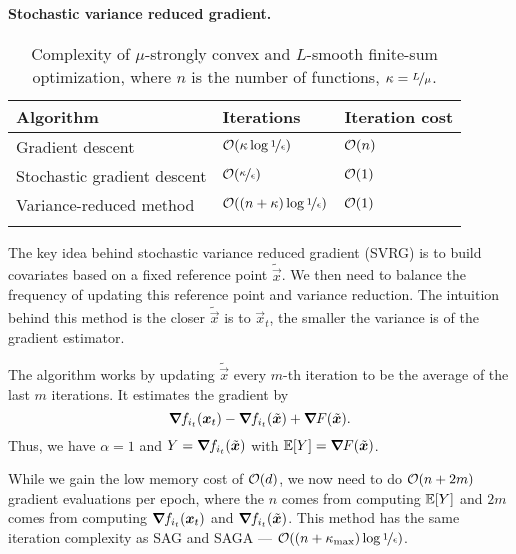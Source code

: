 \paragraph{Stochastic variance reduced gradient.}

\begin{table}[t]
    \centering
    \caption{Complexity of $\mu$-strongly convex and $L$-smooth finite-sum optimization, where $n$ is the number of functions, $\kappa = \nicefrac{L}{\mu}$.}
    \label{tab:vr}
    \begin{tabular}{lll} \toprule
        \textbf{Algorithm}          & \textbf{Iterations}                               & \textbf{Iteration cost} \\
        \midrule
        Gradient descent            & $\bigo{\kappa \log \nicefrac{1}{\epsilon}}$       & $\bigo{n}$              \\
        Stochastic gradient descent & $\bigo{\nicefrac{\kappa}{\epsilon}}$              & $\bigo{1}$              \\
        Variance-reduced method     & $\bigo{(n + \kappa) \log \nicefrac{1}{\epsilon}}$ & $\bigo{1}$              \\
        \bottomrule                                                                                               \\
    \end{tabular}
\end{table}

The key idea behind stochastic variance reduced gradient (SVRG) is to build covariates based on a
fixed reference point $\tilde{\vec{x}}$. We then need to balance the frequency of updating this
reference point and variance reduction. The intuition behind this method is the closer $\tilde{\vec{x}}$ is to $\vec{x}_t$,
the smaller the variance is of the gradient estimator.

The algorithm works by updating $\tilde{\vec{x}}$ every $m$-th iteration to be the average of the
last $m$ iterations. It estimates the gradient by \[
    \bm{\nabla}_{\! } f_{i_t}(\bm{x}_t) - \bm{\nabla}_{\! } f_{i_t}(\tilde{\bm{x}}) + \bm{\nabla}_{\! } F(\tilde{\bm{x}}).
\]
Thus, we have $\alpha=1$ and $Y=\bm{\nabla}_{\! } f_{i_t}(\tilde{\bm{x}})$ with $\mathbb{E}[Y] =
    \bm{\nabla}_{\! } F(\tilde{\bm{x}})$.

While we gain the low memory cost of $\bigo{d}$, we now need to do $\bigo{n+2m}$ gradient
evaluations per epoch, where the $n$ comes from computing $\mathbb{E}[Y]$ and $2m$ comes from computing
$\bm{\nabla}_{\! } f_{i_t}(\bm{x}_t)$ and $\bm{\nabla}_{\! } f_{i_t}(\tilde{\bm{x}})$. This method has the same
iteration complexity as SAG and SAGA --- $\bigo{(n + \kappa_{\max})\log \nicefrac{1}{\epsilon}}$.
